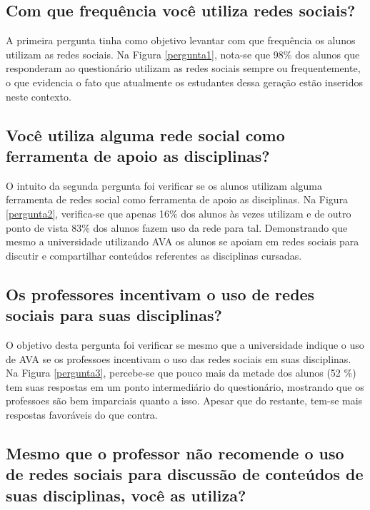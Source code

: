 \subsection*{Com que frequência você utiliza redes sociais?}

A primeira pergunta tinha como objetivo levantar com que frequência os alunos utilizam as redes sociais. Na Figura \ref{pergunta1}, nota-se que 98\% dos alunos que responderam ao questionário utilizam as redes sociais sempre ou frequentemente, o que evidencia o fato que atualmente os estudantes dessa geração estão inseridos neste contexto.

\subsection*{Você utiliza alguma rede social como ferramenta de apoio as disciplinas?}

O intuito da segunda pergunta foi verificar se os alunos utilizam alguma ferramenta de redes social como ferramenta de apoio as disciplinas. Na Figura \ref{pergunta2}, verifica-se que apenas 16\% dos alunos às vezes utilizam e de outro ponto de vista 83\% dos alunos fazem uso da rede para tal. Demonstrando que mesmo a universidade utilizando AVA os alunos se apoiam em redes sociais para discutir e compartilhar conteúdos referentes as disciplinas cursadas.

\subsection*{Os professores incentivam o uso de redes sociais para suas disciplinas?}

O objetivo desta pergunta foi verificar se mesmo que a universidade indique o uso de AVA se os professoes incentivam o uso das redes sociais em suas disciplinas. Na Figura \ref{pergunta3}, percebe-se que pouco mais da metade dos alunos (52 \%) tem suas respostas em um ponto intermediário do questionário, mostrando que os professoes são bem imparciais quanto a isso. Apesar que do restante, tem-se mais respostas favoráveis do que contra.

\subsection*{Mesmo que o professor não recomende o uso de redes sociais para discussão de conteúdos de suas disciplinas, você as utiliza?}


